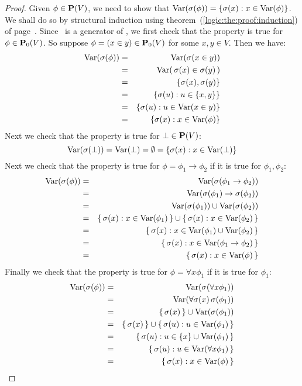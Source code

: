 \begin{proof}
Given $\phi\in\mbox{${\bf P}(V)$}$, we need to show that
$\mbox{\rm Var}(\sigma(\phi))=\{\sigma(x):x\in\mbox{\rm Var}(\phi)\}$. We shall do so by
structural induction using theorem~(\ref{logic:the:proof:induction})
of page~\pageref{logic:the:proof:induction}. Since \pvo\ is a
generator of \pv, we first check that the property is true for
$\phi\in\mbox{${\bf P}_{0}(V)$}$. So suppose $\phi=(x\in y)\in\mbox{${\bf P}_{0}(V)$}$ for some $x,y\in
V$. Then we have:
    \begin{eqnarray*}
    \mbox{\rm Var}(\sigma(\phi))&=&\mbox{\rm Var}(\sigma(x\in y))\\
    &=&\mbox{\rm Var}(\,\sigma(x)\in\sigma(y)\,)\\
    &=&\{\sigma(x),\sigma(y)\}\\
    &=&\{\sigma(u):u\in\{x,y\}\}\\
    &=&\{\sigma(u):u\in\mbox{\rm Var}(x\in y)\}\\
    &=&\{\sigma(x):x\in\mbox{\rm Var}(\phi)\}
    \end{eqnarray*}
Next we check that the property is true for $\bot\in\mbox{${\bf P}(V)$}$:
    \[
    \mbox{\rm Var}(\sigma(\bot))=\mbox{\rm Var}(\bot)=\emptyset=\{\sigma(x):x\in\mbox{\rm Var}(\bot)\}
    \]
Next we check that the property is true for
$\phi=\phi_{1}\to\phi_{2}$ if it is true for $\phi_{1},\phi_{2}$:
    \begin{eqnarray*}
    \mbox{\rm Var}(\sigma(\phi))&=&\mbox{\rm Var}(\sigma(\phi_{1}\to\phi_{2}))\\
    &=&\mbox{\rm Var}(\sigma(\phi_{1})\to\sigma(\phi_{2}))\\
    &=&\mbox{\rm Var}(\sigma(\phi_{1}))\cup\mbox{\rm Var}(\sigma(\phi_{2}))\\
    &=&\{\,\sigma(x):x\in\mbox{\rm Var}(\phi_{1})\,\}\cup\{\,\sigma(x):x\in\mbox{\rm Var}(\phi_{2})\,\}\\
    &=&\{\,\sigma(x):x\in\mbox{\rm Var}(\phi_{1})\cup\mbox{\rm Var}(\phi_{2})\,\}\\
    &=&\{\,\sigma(x):x\in\mbox{\rm Var}(\phi_{1}\to\phi_{2})\,\}\\
    &=&\{\,\sigma(x):x\in\mbox{\rm Var}(\phi)\,\}
    \end{eqnarray*}
Finally we check that the property is true for $\phi=\forall
x\phi_{1}$ if it is true for $\phi_{1}$:
    \begin{eqnarray*}
    \mbox{\rm Var}(\sigma(\phi))&=&\mbox{\rm Var}(\sigma(\forall x\phi_{1}))\\
    &=&\mbox{\rm Var}(\forall\sigma(x)\,\sigma(\phi_{1}))\\
    &=&\{\,\sigma(x)\,\}\cup\mbox{\rm Var}(\sigma(\phi_{1}))\\
    &=&\{\,\sigma(x)\,\}\cup\{\,\sigma(u):u\in\mbox{\rm Var}(\phi_{1})\,\}\\
    &=&\{\,\sigma(u):u\in\{x\}\cup\mbox{\rm Var}(\phi_{1})\,\}\\
    &=&\{\,\sigma(u):u\in\mbox{\rm Var}(\forall x\phi_{1})\,\}\\
    &=&\{\,\sigma(x):x\in\mbox{\rm Var}(\phi)\,\}
    \end{eqnarray*}
\end{proof}

